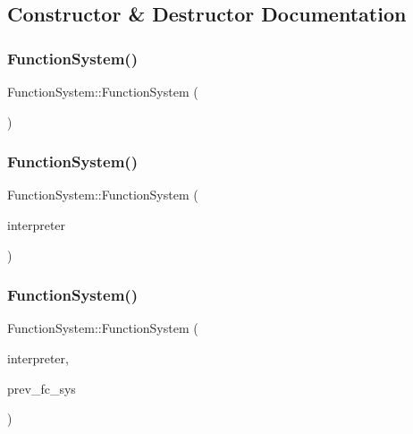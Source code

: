 \subsection{Constructor \& Destructor Documentation}
\mbox{\label{classFunctionSystem_a66e3b5e5118f00a940c3e4a2f138c9c6}} 
\subsubsection{\texorpdfstring{Function\+System()}{FunctionSystem()}\hspace{0.1cm}{\footnotesize\ttfamily [1/3]}}
{\footnotesize\ttfamily Function\+System\+::\+Function\+System (\begin{DoxyParamCaption}{ }\end{DoxyParamCaption})}

\mbox{\label{classFunctionSystem_acad46fc5783fee1962d2450ea181f310}} 
\subsubsection{\texorpdfstring{Function\+System()}{FunctionSystem()}\hspace{0.1cm}{\footnotesize\ttfamily [2/3]}}
{\footnotesize\ttfamily Function\+System\+::\+Function\+System (\begin{DoxyParamCaption}\item[{\hyperlink{classInterpreter}{Interpreter} $\ast$}]{interpreter }\end{DoxyParamCaption})}

\mbox{\label{classFunctionSystem_a720ae7e377cda0548bd8f1ef3c9390d9}} 
\subsubsection{\texorpdfstring{Function\+System()}{FunctionSystem()}\hspace{0.1cm}{\footnotesize\ttfamily [3/3]}}
{\footnotesize\ttfamily Function\+System\+::\+Function\+System (\begin{DoxyParamCaption}\item[{\hyperlink{classInterpreter}{Interpreter} $\ast$}]{interpreter,  }\item[{\hyperlink{classFunctionSystem}{Function\+System} $\ast$}]{prev\+\_\+fc\+\_\+sys }\end{DoxyParamCaption})}

